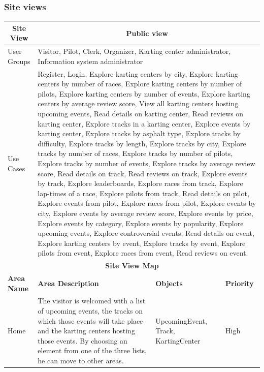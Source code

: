 \documentclass{beamer}
\begin{document}
\begin{frame}
    \frametitle{Site views}
    \begin{table}
        \centering
        \tiny
        \setlength{\tabcolsep}{1pt}
        \begin{tabular}{|m{2cm}|m{4cm}|m{3cm}|m{1cm}|}
        \hline
        \multicolumn{1}{|c|}{\textbf{Site View}} & \multicolumn{3}{c|}{\textbf{Public view}} \\ 
        \hline
        User Groups & \multicolumn{3}{m{8cm}|}{Visitor, Pilot, Clerk, Organizer, 
        Karting center administrator, Information system administrator} \\
        \hline
        Use Cases & \multicolumn{3}{m{8cm}|}{Register, Login, Explore karting centers by city, 
        Explore karting centers by number of races, Explore karting centers by number of pilots, 
        Explore karting centers by number of events, Explore karting centers by average review score, 
        View all karting centers hosting upcoming events, Read details on karting center, 
        Read reviews on karting center, Explore tracks in a karting center, Explore events by karting center, 
        Explore tracks by asphalt type, Explore tracks by difficulty, Explore tracks by length, 
        Explore tracks by city, Explore tracks by number of races, Explore tracks by number of pilots, 
        Explore tracks by number of events, Explore tracks by average review score, Read details on track, 
        Read reviews on track, Explore events by track, Explore leaderboards, Explore races from track, 
        Explore lap-times of a race, Explore pilots from track, Read details on pilot, Explore events from pilot, 
        Explore races from pilot, Explore events by city, Explore events by average review score, 
        Explore events by price, Explore events by category, Explore events by popularity, 
        Explore upcoming events, Explore controversial events, Read details on event, 
        Explore karting centers by event, Explore tracks by event, Explore pilots from event, 
        Explore races from event, Read reviews on event.
        } \\
        \hline
        \multicolumn{4}{|c|}{\textbf{Site View Map}} \\
        \hline
        \textbf{Area Name} & \textbf{Area Description} & \textbf{Objects} & \textbf{Priority} \\
        \hline
        Home & The visitor is welcomed with a list of upcoming events,
        the tracks on which those events will take place and the karting centers hosting those events.
        By choosing an element from one of the three lists, he can move to other areas.
        & UpcomingEvent, Track, KartingCenter & High \\
        \hline
        \end{tabular}
    \end{table}
\end{frame}
\end{document}
